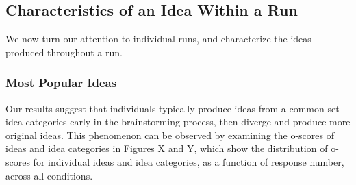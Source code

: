 

\subsection{Characteristics of an Idea Within a Run}
We now turn our attention to individual runs, and characterize the ideas produced throughout a run.

\subsubsection{Most Popular Ideas}
Our results suggest that individuals typically produce ideas from a common set idea categories early in the brainstorming process, then diverge and produce more original ideas. This phenomenon can be observed by examining the o-scores of ideas and idea categories in Figures X and Y, which show the distribution of o-scores for individual ideas and idea categories, as a function of response number, across all conditions.






